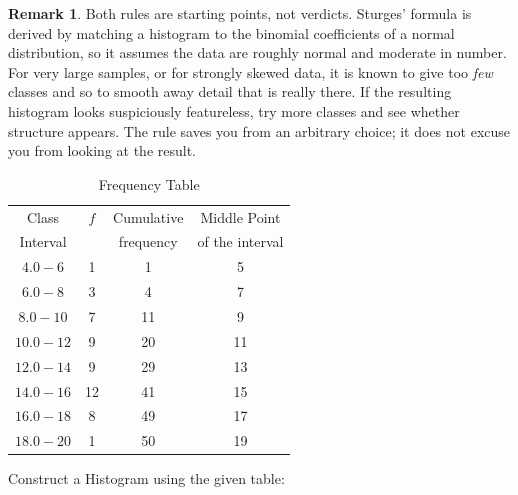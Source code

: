 \documentclass[11pt,a4paper]{article}
\theoremstyle{definition}
\newtheorem{remark}[thm]{Remark}
\begin{document}
\begin{remark}
Both rules are starting points, not verdicts. Sturges' formula is derived by matching a
histogram to the binomial coefficients of a normal distribution, so it assumes the data are
roughly normal and moderate in number. For very large samples, or for strongly skewed data,
it is known to give too \emph{few} classes and so to smooth away detail that is really there.
If the resulting histogram looks suspiciously featureless, try more classes and see whether
structure appears. The rule saves you from an arbitrary choice; it does not excuse you from
looking at the result.
\end{remark}





\begin{table}[H]
\centering
\caption{Frequency Table}
\label{table: Freguency Table}
\begin{tabular}{|c|c|c|c|}
\hline Class & $f$ & Cumulative & Middle Point\\
Interval && frequency & of the interval\\
\hline $4.0-6$&1&1&5\\
$6.0-8$&3&4&7\\
$8.0-10$&7&11&9\\
$10.0-12$&9&20&11\\
$12.0-14$ &9&29&13\\
$14.0-16$ &12&41&15\\
$16.0-18$&8&49&17\\
$18.0-20$&1&50&19\\
\hline
\end{tabular}
\end{table}


Construct a Histogram using the given table:\\[1ex]





\end{document}
